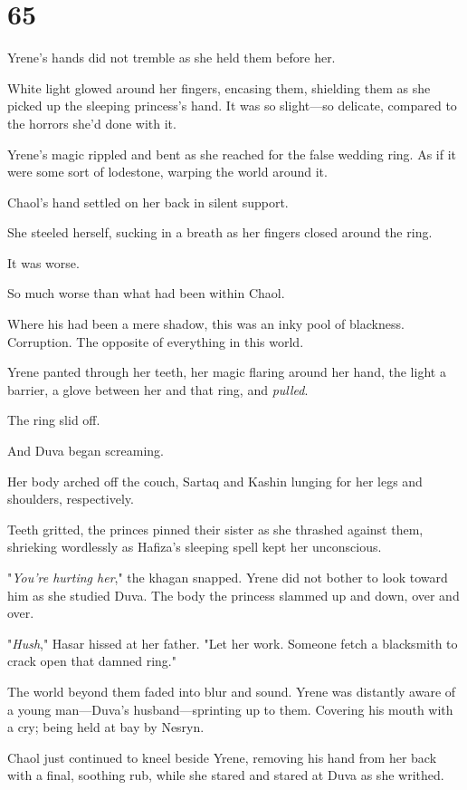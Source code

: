 
\chapter{65}

Yrene's hands did not tremble as she held them before her.

White light glowed around her fingers, encasing them, shielding them as she picked up the sleeping princess's hand. It was so slight---so delicate, compared to the horrors she'd done with it.

Yrene's magic rippled and bent as she reached for the false wedding ring. As if it were some sort of lodestone, warping the world around it.

Chaol's hand settled on her back in silent support.

She steeled herself, sucking in a breath as her fingers closed around the ring.

It was worse.

So much worse than what had been within Chaol.

Where his had been a mere shadow, this was an inky pool of blackness. Corruption. The opposite of everything in this world.

Yrene panted through her teeth, her magic flaring around her hand, the light a barrier, a glove between her and that ring, and \emph{pulled}.

The ring slid off.

And Duva began screaming.

Her body arched off the couch, Sartaq and Kashin lunging for her legs and shoulders, respectively.

Teeth gritted, the princes pinned their sister as she thrashed against them, shrieking wordlessly as Hafiza's sleeping spell kept her unconscious.

"\emph{You're hurting her}," the khagan snapped. Yrene did not bother to look toward him as she studied Duva. The body the princess slammed up and down, over and over.

"\emph{Hush}," Hasar hissed at her father. "Let her work. Someone fetch a blacksmith to crack open that damned ring."

The world beyond them faded into blur and sound. Yrene was distantly aware of a young man---Duva's husband---sprinting up to them. Covering his mouth with a cry; being held at bay by Nesryn.

Chaol just continued to kneel beside Yrene, removing his hand from her back with a final, soothing rub, while she stared and stared at Duva as she writhed.

